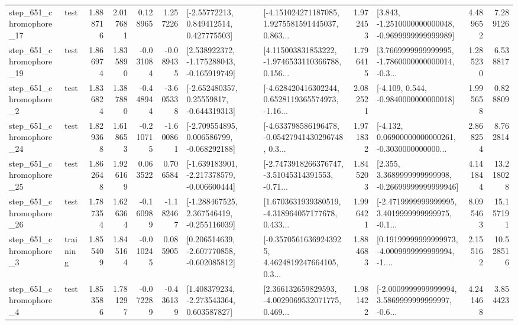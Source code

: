 \begin{tabular}{llrrrrllrlrr}
  step\_651\_chromophore\_17 &      test &      1.888716 &    2.017681 &      0.128965 &  1.257226 &     [-2.55772213, 0.849412514, 0.427775503] &  [-4.151024271187085, 1.9275581591445037, 0.863... &       1.972453 &  [3.843, -1.2510000000000048, -0.9699999999999989] &            4.489652 &          7.289126 \\
  step\_651\_chromophore\_19 &      test &      1.866974 &    1.835890 &     -0.031084 & -0.089435 &   [2.538922372, -1.175288043, -0.165919749] &  [4.115003831853222, -1.9746533110366788, 0.156... &       1.796415 &  [3.7669999999999995, -1.7860000000000014, -0.3... &            1.285230 &          6.538817 \\
   step\_651\_chromophore\_2 &      test &      1.836824 &    1.387880 &     -0.448944 & -3.605338 &    [-2.652480357, 0.25559817, -0.644319313] &  [-4.628420416302244, 0.6528119365574973, -1.16... &       2.082521 &               [-4.109, 0.544, -0.9840000000000018] &            1.995658 &          0.828809 \\
  step\_651\_chromophore\_24 &      test &      1.829368 &    1.618653 &     -0.210715 & -1.600861 &   [-2.709554895, 0.006586799, -0.068292188] &  [-4.633798586196478, -0.05427941430296748, 0.3... &       1.971832 &  [-4.132, 0.06900000000000261, -0.3030000000000... &            2.868254 &          8.762814 \\
  step\_651\_chromophore\_25 &      test &      1.862648 &    1.926169 &      0.063522 &  0.706584 &  [-1.639183901, -2.217378579, -0.006600444] &  [-2.7473918266376747, -3.51045314391553, -0.71... &       1.845203 &  [2.355, 3.3689999999999998, -0.26699999999999946] &            4.141844 &         13.218028 \\
  step\_651\_chromophore\_26 &      test &      1.787354 &    1.626364 &     -0.160989 & -1.182467 &   [-1.288467525, 2.367546419, -0.255116039] &  [1.6703631939380519, -4.318964057177678, 0.433... &       1.996421 &  [-2.4719999999999995, 3.4019999999999975, -0.1... &            8.095463 &         15.157191 \\
   step\_651\_chromophore\_3 &  training &      1.855409 &    1.845164 &     -0.010245 &  0.085905 &   [0.206514639, -2.607770858, -0.602085812] &  [-0.35705616369243925, 4.4624819247664105, 0.3... &       1.884683 &  [0.19199999999999973, -4.0009999999999994, -1.... &            2.155162 &         10.528516 \\
   step\_651\_chromophore\_4 &      test &      1.853586 &    1.781297 &     -0.072289 & -0.436139 &    [1.408379234, -2.273543364, 0.603587827] &  [2.366132659829593, -4.0029069532071775, 0.469... &       1.981422 &  [-2.0009999999999994, 3.5869999999999997, -0.6... &            4.241468 &          3.854423 \\

\end{tabular}
